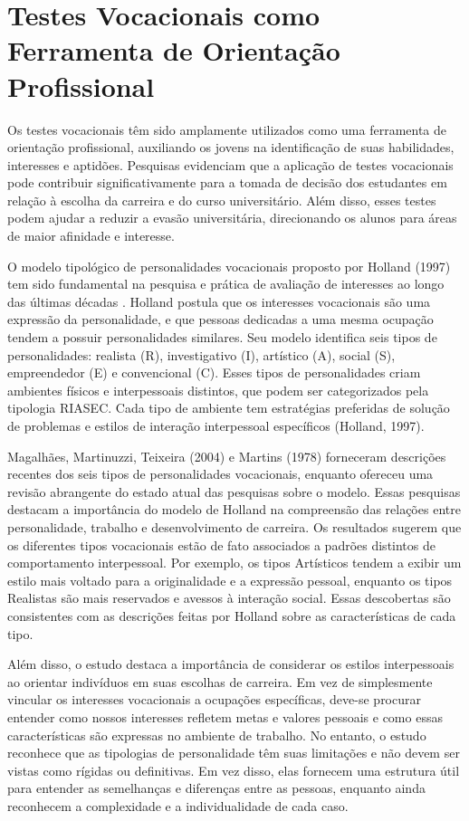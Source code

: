 \section{Testes Vocacionais como Ferramenta de Orientação Profissional}

Os testes vocacionais têm sido amplamente utilizados como uma ferramenta de orientação profissional, auxiliando os jovens na identificação de suas habilidades, interesses e aptidões. Pesquisas evidenciam que a aplicação de testes vocacionais pode contribuir significativamente para a tomada de decisão dos estudantes em relação à escolha da carreira e do curso universitário. Além disso, esses testes podem ajudar a reduzir a evasão universitária, direcionando os alunos para áreas de maior afinidade e interesse.

O modelo tipológico de personalidades vocacionais proposto por Holland (1997) tem sido fundamental na pesquisa e prática de avaliação de interesses ao longo das últimas décadas \cite{de2006relaccao}. Holland postula que os interesses vocacionais são uma expressão da personalidade, e que pessoas dedicadas a uma mesma ocupação tendem a possuir personalidades similares. Seu modelo identifica seis tipos de personalidades: realista (R), investigativo (I), artístico (A), social (S), empreendedor (E) e convencional (C). Esses tipos de personalidades criam ambientes físicos e interpessoais distintos, que podem ser categorizados pela tipologia RIASEC. Cada tipo de ambiente tem estratégias preferidas de solução de problemas e estilos de interação interpessoal específicos (Holland, 1997). 

Magalhães, Martinuzzi, Teixeira (2004) e Martins (1978) forneceram descrições recentes dos seis tipos de personalidades vocacionais, enquanto \cite{de2006relaccao} ofereceu uma revisão abrangente do estado atual das pesquisas sobre o modelo. Essas pesquisas destacam a importância do modelo de Holland na compreensão das relações entre personalidade, trabalho e desenvolvimento de carreira. Os resultados sugerem que os diferentes tipos vocacionais estão de fato associados a padrões distintos de comportamento interpessoal. Por exemplo, os tipos Artísticos tendem a exibir um estilo mais voltado para a originalidade e a expressão pessoal, enquanto os tipos Realistas são mais reservados e avessos à interação social. Essas descobertas são consistentes com as descrições feitas por Holland sobre as características de cada tipo.

Além disso, o estudo destaca a importância de considerar os estilos interpessoais ao orientar indivíduos em suas escolhas de carreira. Em vez de simplesmente vincular os interesses vocacionais a ocupações específicas, deve-se procurar entender como nossos interesses refletem metas e valores pessoais e como essas características são expressas no ambiente de trabalho.  No entanto, o estudo reconhece que as tipologias de personalidade têm suas limitações e não devem ser vistas como rígidas ou definitivas. Em vez disso, elas fornecem uma estrutura útil para entender as semelhanças e diferenças entre as pessoas, enquanto ainda reconhecem a complexidade e a individualidade de cada caso.


